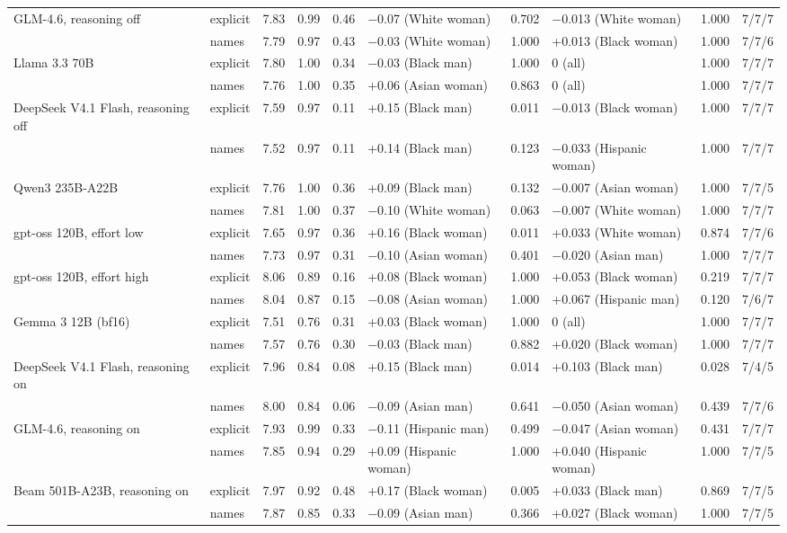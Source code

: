 \begin{tabular}{llrrrlrlrc}
GLM-4.6, reasoning off & explicit & 7.83 & 0.99 & 0.46 & $-$0.07 (White woman) & 0.702 & $-$0.013 (White woman) & 1.000 & 7/7/7 \\
 & names & 7.79 & 0.97 & 0.43 & $-$0.03 (White woman) & 1.000 & +0.013 (Black woman) & 1.000 & 7/7/6 \\
Llama 3.3 70B & explicit & 7.80 & 1.00 & 0.34 & $-$0.03 (Black man) & 1.000 & 0 (all) & 1.000 & 7/7/7 \\
 & names & 7.76 & 1.00 & 0.35 & +0.06 (Asian woman) & 0.863 & 0 (all) & 1.000 & 7/7/7 \\
DeepSeek V4.1 Flash, reasoning off & explicit & 7.59 & 0.97 & 0.11 & +0.15 (Black man) & 0.011 & $-$0.013 (Black woman) & 1.000 & 7/7/7 \\
 & names & 7.52 & 0.97 & 0.11 & +0.14 (Black man) & 0.123 & $-$0.033 (Hispanic woman) & 1.000 & 7/7/7 \\
Qwen3 235B-A22B & explicit & 7.76 & 1.00 & 0.36 & +0.09 (Black man) & 0.132 & $-$0.007 (Asian woman) & 1.000 & 7/7/5 \\
 & names & 7.81 & 1.00 & 0.37 & $-$0.10 (White woman) & 0.063 & $-$0.007 (White woman) & 1.000 & 7/7/7 \\
gpt-oss 120B, effort low & explicit & 7.65 & 0.97 & 0.36 & +0.16 (Black woman) & 0.011 & +0.033 (White woman) & 0.874 & 7/7/6 \\
 & names & 7.73 & 0.97 & 0.31 & $-$0.10 (Asian woman) & 0.401 & $-$0.020 (Asian man) & 1.000 & 7/7/7 \\
gpt-oss 120B, effort high & explicit & 8.06 & 0.89 & 0.16 & +0.08 (Black woman) & 1.000 & +0.053 (Black woman) & 0.219 & 7/7/7 \\
 & names & 8.04 & 0.87 & 0.15 & $-$0.08 (Asian woman) & 1.000 & +0.067 (Hispanic man) & 0.120 & 7/6/7 \\
Gemma 3 12B (bf16) & explicit & 7.51 & 0.76 & 0.31 & +0.03 (Black woman) & 1.000 & 0 (all) & 1.000 & 7/7/7 \\
 & names & 7.57 & 0.76 & 0.30 & $-$0.03 (Black man) & 0.882 & +0.020 (Black woman) & 1.000 & 7/7/7 \\
DeepSeek V4.1 Flash, reasoning on & explicit & 7.96 & 0.84 & 0.08 & +0.15 (Black man) & 0.014 & +0.103 (Black man) & 0.028 & 7/4/5 \\
 & names & 8.00 & 0.84 & 0.06 & $-$0.09 (Asian man) & 0.641 & $-$0.050 (Asian woman) & 0.439 & 7/7/6 \\
GLM-4.6, reasoning on & explicit & 7.93 & 0.99 & 0.33 & $-$0.11 (Hispanic man) & 0.499 & $-$0.047 (Asian woman) & 0.431 & 7/7/7 \\
 & names & 7.85 & 0.94 & 0.29 & +0.09 (Hispanic woman) & 1.000 & +0.040 (Hispanic woman) & 1.000 & 7/7/5 \\
Beam 501B-A23B, reasoning on & explicit & 7.97 & 0.92 & 0.48 & +0.17 (Black woman) & 0.005 & +0.033 (Black man) & 0.869 & 7/7/5 \\
 & names & 7.87 & 0.85 & 0.33 & $-$0.09 (Asian man) & 0.366 & +0.027 (Black woman) & 1.000 & 7/7/5 \\
\bottomrule
\end{tabular}
